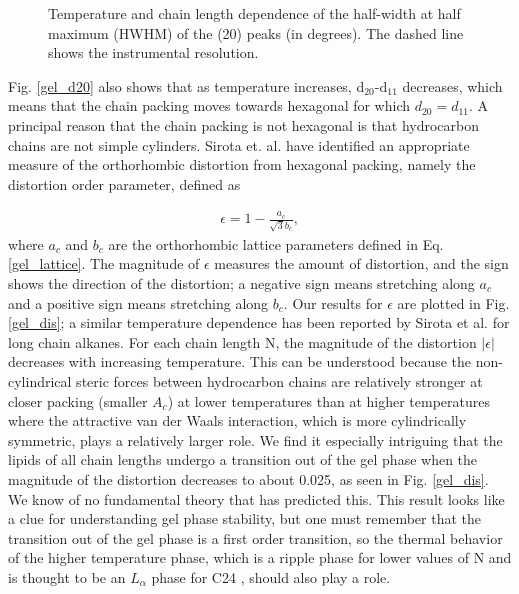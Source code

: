 \begin{figure}
\centerline {}
\caption{Temperature and chain length dependence of
the half-width at half maximum (HWHM) of the (20) peaks (in degrees).
The dashed line shows the instrumental resolution.
\label{gel_hwh}}
\end{figure}

Fig. \ref{gel_d20} also shows that as temperature increases, 
d$_{20}$-d$_{11}$ decreases,
which means that the chain packing moves towards hexagonal for which
$d_{20}=d_{11}$.  A principal reason that the chain packing is not hexagonal
is that hydrocarbon chains are not simple cylinders.
Sirota et. al. \cite{Sir93} have identified an 
appropriate measure of the orthorhombic distortion from hexagonal
packing, namely the distortion order parameter, defined as

\begin{eqnarray}
\label{distort}
\epsilon = 1 - \frac{a_c}{\sqrt{3} b_c}, 
\end{eqnarray}
where $a_c$ and $b_c$ are the orthorhombic lattice parameters defined in 
Eq. \ref{gel_lattice}. The magnitude
of $\epsilon$ measures the amount of distortion, and the sign shows
the direction of the distortion; a negative sign means stretching
along $a_c$ and a positive sign means stretching along $b_c$.
Our results for $\epsilon$ are plotted in Fig. \ref{gel_dis}; a similar 
temperature
dependence has been reported by Sirota et al. \cite{Sir93} for long 
chain alkanes.
For each chain length N, the 
magnitude of the distortion $|\epsilon|$ decreases with increasing temperature.
This can be understood because the non-cylindrical steric forces between
hydrocarbon chains are relatively stronger at closer packing (smaller $A_c$) 
at lower temperatures than at higher temperatures where the 
attractive van der Waals interaction, which is more cylindrically symmetric, 
plays a relatively larger role.
We find it especially intriguing that the lipids of all chain lengths undergo a
transition out of the gel phase when the magnitude of the distortion 
decreases to about 0.025, as seen in Fig. \ref{gel_dis}. We know of no 
fundamental
theory that has predicted this.  This result looks like a clue
for understanding gel phase stability, but one must remember that
the transition out of the gel phase is a first order transition,
so the thermal behavior of the higher temperature phase, which
is a ripple phase for lower values of N and is thought
to be an $L_{\alpha}$ phase for C24 \cite{Lew87}, should also 
play a role.

